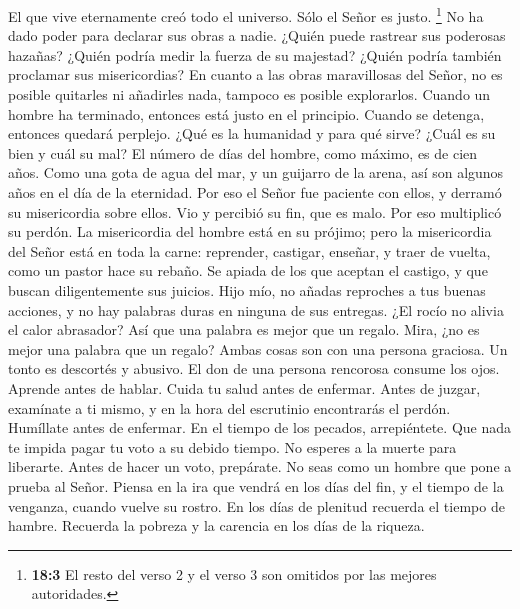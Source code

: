  El que vive eternamente creó todo el universo.
 Sólo el Señor es justo.  \footnote{\textbf{18:3}
  El resto del verso 2 y el verso 3 son omitidos por las mejores
  autoridades.}  No ha dado poder para declarar sus obras
a nadie. ¿Quién puede rastrear sus poderosas hazañas? 
¿Quién podría medir la fuerza de su majestad? ¿Quién podría también
proclamar sus misericordias?  En cuanto a las obras
maravillosas del Señor, no es posible quitarles ni añadirles nada,
tampoco es posible explorarlos.  Cuando un hombre ha
terminado, entonces está justo en el principio. Cuando se detenga,
entonces quedará perplejo.  ¿Qué es la humanidad y para
qué sirve? ¿Cuál es su bien y cuál su mal?  El número de
días del hombre, como máximo, es de cien años.  Como una
gota de agua del mar, y un guijarro de la arena, así son algunos años en
el día de la eternidad.  Por eso el Señor fue paciente
con ellos, y derramó su misericordia sobre ellos.  Vio y
percibió su fin, que es malo. Por eso multiplicó su perdón.
 La misericordia del hombre está en su prójimo; pero la
misericordia del Señor está en toda la carne: reprender, castigar,
enseñar, y traer de vuelta, como un pastor hace su rebaño.
 Se apiada de los que aceptan el castigo, y que buscan
diligentemente sus juicios.  Hijo mío, no añadas
reproches a tus buenas acciones, y no hay palabras duras en ninguna de
sus entregas.  ¿El rocío no alivia el calor abrasador?
Así que una palabra es mejor que un regalo.  Mira, ¿no es
mejor una palabra que un regalo? Ambas cosas son con una persona
graciosa.  Un tonto es descortés y abusivo. El don de una
persona rencorosa consume los ojos.  Aprende antes de
hablar. Cuida tu salud antes de enfermar.  Antes de
juzgar, examínate a ti mismo, y en la hora del escrutinio encontrarás el
perdón.  Humíllate antes de enfermar. En el tiempo de los
pecados, arrepiéntete.  Que nada te impida pagar tu voto
a su debido tiempo. No esperes a la muerte para liberarte.
 Antes de hacer un voto, prepárate. No seas como un
hombre que pone a prueba al Señor.  Piensa en la ira que
vendrá en los días del fin, y el tiempo de la venganza, cuando vuelve su
rostro.  En los días de plenitud recuerda el tiempo de
hambre. Recuerda la pobreza y la carencia en los días de la riqueza.

